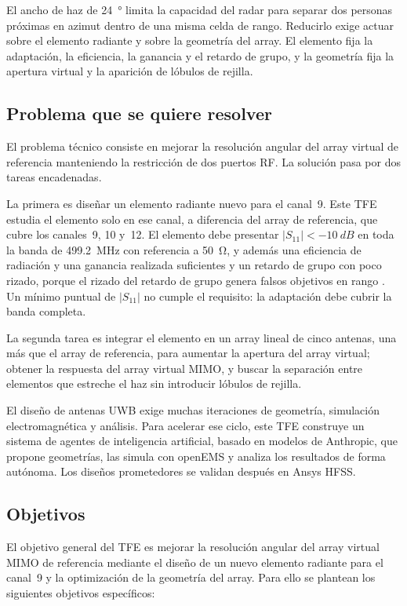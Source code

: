 \documentclass[11pt,a4paper]{article}
\begin{document}
El ancho de haz de \SI{24}{\degree} limita la capacidad del radar para separar dos personas
próximas en azimut dentro de una misma celda de rango. Reducirlo exige actuar sobre el elemento
radiante y sobre la geometría del array. El elemento fija la adaptación, la eficiencia, la
ganancia y el retardo de grupo, y la geometría fija la apertura virtual y la aparición de lóbulos
de rejilla.

\subsection{Problema que se quiere resolver}
El problema técnico consiste en mejorar la resolución angular del array virtual de referencia
manteniendo la restricción de dos puertos RF. La solución pasa por dos tareas encadenadas.

La primera es diseñar un elemento radiante nuevo para el canal~9. Este TFE estudia el elemento
solo en ese canal, a diferencia del array de referencia, que cubre los canales~9, 10 y~12. El
elemento debe presentar $|S_{11}| < \SI{-10}{dB}$ en toda la banda de \SI{499.2}{MHz} con
referencia a \SI{50}{\ohm}, y además una eficiencia de radiación y una ganancia realizada
suficientes y un retardo de grupo con poco rizado, porque el rizado del retardo de grupo genera
falsos objetivos en rango \cite{carretero2027vpa}. Un mínimo puntual de $|S_{11}|$ no cumple el
requisito: la adaptación debe cubrir la banda completa.

La segunda tarea es integrar el elemento en un array lineal de cinco antenas, una más que el
array de referencia, para aumentar la apertura del array virtual; obtener la respuesta del array
virtual MIMO, y buscar la separación entre elementos que estreche el haz sin introducir lóbulos de
rejilla.

El diseño de antenas UWB exige muchas iteraciones de geometría, simulación electromagnética y
análisis. Para acelerar ese ciclo, este TFE construye un sistema de agentes de inteligencia
artificial, basado en modelos de Anthropic, que propone geometrías, las simula con openEMS y
analiza los resultados de forma autónoma. Los diseños prometedores se validan después en Ansys
HFSS.

\subsection{Objetivos}
El objetivo general del TFE es mejorar la resolución angular del array virtual MIMO de referencia
mediante el diseño de un nuevo elemento radiante para el canal~9 y la optimización de la
geometría del array. Para ello se plantean los siguientes objetivos específicos:
\end{document}
